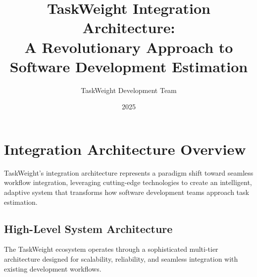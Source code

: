 \documentclass[12pt,a4paper]{article}
\title{\textbf{TaskWeight Integration Architecture:\\A Revolutionary Approach to Software Development Estimation}}
\author{TaskWeight Development Team}
\date{2025}
\begin{document}
\maketitle

\section{Integration Architecture Overview}

TaskWeight's integration architecture represents a paradigm shift toward seamless workflow integration, leveraging cutting-edge technologies to create an intelligent, adaptive system that transforms how software development teams approach task estimation.

\subsection{High-Level System Architecture}

The TaskWeight ecosystem operates through a sophisticated multi-tier architecture designed for scalability, reliability, and seamless integration with existing development workflows.
\end{document}
